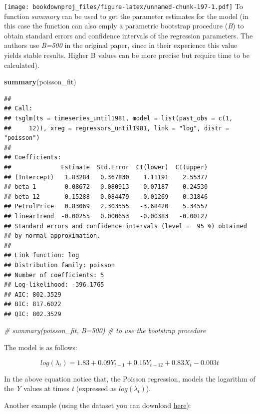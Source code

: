\documentclass[
]{article}
\newenvironment{Shaded}{\begin{snugshade}}{\end{snugshade}}
\newcommand{\CommentTok}[1]{\textcolor[rgb]{0.56,0.35,0.01}{\textit{#1}}}
\newcommand{\KeywordTok}[1]{\textcolor[rgb]{0.13,0.29,0.53}{\textbf{#1}}}
\newcommand{\NormalTok}[1]{#1}
\begin{document}
\texttt{[image: bookdownproj\_files/figure-latex/unnamed-chunk-197-1.pdf]}
To function \emph{summary} can be used to get the parameter estimates for the model (in this case the function can also emply a parametric bootstrap procedure (\emph{B}) to obtain standard errors and confidence intervals of the regression parameters. The authors use \emph{B=500} in the original paper, since in their experience this value yields stable results. Higher B values can be more precise but require time to be calculated).

\begin{Shaded}
\begin{Highlighting}[]
\KeywordTok{summary}\NormalTok{(poisson_fit)}
\end{Highlighting}
\end{Shaded}

\begin{verbatim}
## 
## Call:
## tsglm(ts = timeseries_until1981, model = list(past_obs = c(1, 
##     12)), xreg = regressors_until1981, link = "log", distr = "poisson")
## 
## Coefficients:
##              Estimate  Std.Error  CI(lower)  CI(upper)
## (Intercept)   1.83284   0.367830    1.11191    2.55377
## beta_1        0.08672   0.080913   -0.07187    0.24530
## beta_12       0.15288   0.084479   -0.01269    0.31846
## PetrolPrice   0.83069   2.303555   -3.68420    5.34557
## linearTrend  -0.00255   0.000653   -0.00383   -0.00127
## Standard errors and confidence intervals (level =  95 %) obtained
## by normal approximation.
## 
## Link function: log 
## Distribution family: poisson 
## Number of coefficients: 5 
## Log-likelihood: -396.1765 
## AIC: 802.3529 
## BIC: 817.6022 
## QIC: 802.3529
\end{verbatim}

\begin{Shaded}
\begin{Highlighting}[]
\CommentTok{# summary(poisson_fit, B=500) # to use the bootstrap procedure}
\end{Highlighting}
\end{Shaded}

The model is as follows:

\[
log(\lambda_t) = 1.83 + 0.09Y_{t-1} + 0.15Y_{t-12} + 0.83X_t - 0.003t
\]

In the above equation notice that, the Poisson regression, models the logarithm of the \emph{Y} values at times \emph{t} (expressed as \(log(\lambda_t)\)).

Another example (using the dataset you can download \href{https://drive.google.com/file/d/1eIOERBLCUCaap3WCoM5QT6I0iTW-Hqwa/view?usp=sharing}{here}):
\end{document}
